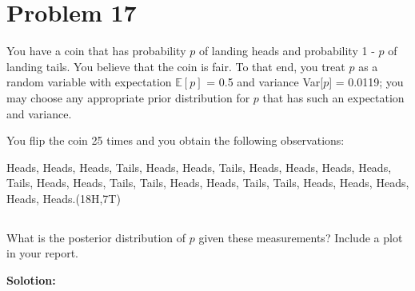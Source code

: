 \documentclass[a4paper,11pt,reqno]{amsart}
\begin{document}
\section{Problem 17}
You have a coin that has probability $p$ of landing heads and probability 1 - $p$ of landing tails. You
believe that the coin is fair. To that end, you treat $p$ as a random variable with expectation 
$\mathbb{E}[p]$ = 0.5
and variance Var[$p$] = 0.0119; you may choose any appropriate prior distribution for $p$ that has such
an expectation and variance.

You flip the coin 25 times and you obtain the following observations:

\vspace{1em}

Heads, Heads, Heads, Tails, Heads, Heads, Tails, Heads, Heads, Heads, Heads, Tails, Heads, Heads,
Tails, Tails, Heads, Heads, Tails, Tails, Heads, Heads, Heads, Heads, Heads.(18H,7T)

\subsection{}
What is the posterior distribution of $p$ given these measurements? Include a plot in your report.

\textbf{Solotion:}


\end{document}
